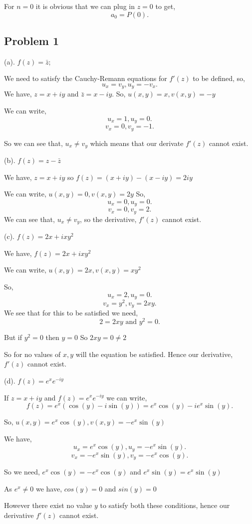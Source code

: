 \documentclass[a4paper]{report}
\begin{document}
For $n = 0$ it is obvious that we can plug in  $z = 0$ to get,  \[
a_0 = P(0)
.\] 


\subsection*{Problem 1}
(a). $f(z) = \bar z$;

We need to satisfy the Cauchy-Remann equations for $f'(z)$ to be defined, so, \[
    u_x = v_y, u_y = -v_x
.\] 
We have, $z = x + iy$ and $\bar z = x - iy$. So, $u(x,y) = x, v(x,y) = -y$

We can write,  \[
    u_x = 1, u_y = 0
.\]
\[
    v_x = 0, v_y = -1
.\] 

So we can see that, $u_x \neq v_y$ which means that our derivate $f'(z)$ cannot exist.

(b). $f(z) = z - \bar z$

We have, $z = x + iy$ so  $f(z) = (x + iy) - (x - iy) = 2iy$

We can write,  $u(x,y) = 0, v(x,y) =  2y$
So, 
 \[
    u_x = 0, u_y = 0
.\] 
\[
v_x = 0, v_y = 2
.\] 
We can see that, $u_x \neq v_y$, so the derivative, $f'(z)$ cannot exist.


(c). $f(z) = 2x + ixy^2$

We have, $f(z) = 2x + ixy^2$

We can write, $u(x,y) = 2x, v(x,y) = xy^2$

So, \[
u_x = 2, u_y = 0
.\]
\[
v_x = y^2, v_y = 2xy
.\] 
We see that for this to be satisfied we need, \[
    2 = 2xy \text{ and } y^2 = 0
.\] 

But if $y^2 = 0$ then $y = 0$ So  $2xy = 0 \neq 2$

So for no values of $x,y$ will the equation be satisfied. Hence our derivative,  $f'(z)$ cannot exist.

(d). $f(z) = e^x e^{-iy}$

If $z = x + iy$ and  $f(z) = e^x e^{-iy}$ we can write, \[
f(z) = e^x (\cos(y) - i\sin(y)) = e^x\cos(y) - ie^x\sin(y)
.\] 

So, $u(x,y) = e^x\cos(y), v(x,y) = -e^x\sin(y)$

We have, \[
u_x = e^x\cos(y), u_y = -e^x\sin(y)
.\] 
\[
v_x = -e^x\sin(y), v_y = -e^x\cos(y)
.\] 

So we need, $e^x\cos(y) = -e^x\cos(y)$ and $e^x\sin(y) = e^x\sin(y)$

As $e^x \neq 0$ we have, $cos(y) = 0$ and  $sin(y) = 0$

However there exist no value  $y$ to satisfy both these conditions, hence our derivative  $f'(z)$ cannot exist.
\end{document}
